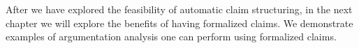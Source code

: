 After we have explored the feasibility of automatic claim structuring, in the
next chapter we will explore the benefits of having formalized claims. 
We demonstrate examples of argumentation analysis one can perform using
formalized claims. 


% 
